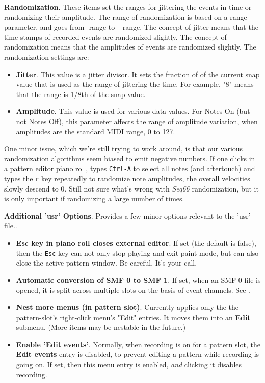    \textbf{Randomization}.
   These items set the ranges for jittering the events in time or
   randomizing their amplitude.
   The range of randomization is based on a range parameter, and
   goes from -range to +range.
   The concept of jitter means that the time-stamps of recorded events
   are randomized slightly.
   The concept of randomization means that the amplitudes of events
   are randomized slightly.
   The randomization settings are:

   \begin{itemize}
      \item \textbf{Jitter}.
         This value is a jitter divisor.
         It sets the fraction of of the current snap value that
         is used as the range of jittering the time.
         For example, "8" means that the range is 1/8th of the snap value.
      \item \textbf{Amplitude}.
         This value is used for various data values.
         For Notes On (but not Notes Off), this parameter affects
         the range of amplitude variation, when amplitudes are
         the standard MIDI range, 0 to 127.
   \end{itemize}

   One minor issue, which we're still trying to work around, is that
   our various randomization algorithms seem biased to emit
   negative numbers.
   If one clicks in a pattern editor piano roll, types
   \texttt{Ctrl-A} to select all notes (and aftertouch)
   and types the \texttt{r} key repeatedly to randomize
   note amplitudes, the overall velocities slowly descend to 0.
   Still not sure what's wrong with \textsl{Seq66} randomization, 
   but it is only important if randomizing a large number of times.

   \textbf{Additional 'usr' Options}.
   Provides a few minor options relevant to the 'usr' file..

   \begin{itemize}
      \item \textbf{Esc key in piano roll closes external editor}.
         If set (the default is false), then the \texttt{Esc}
         key can not only stop playing and exit paint mode, but
         can also close the active pattern window.
         Be careful. It's your call.
      \item \textbf{Automatic conversion of SMF 0 to SMF 1}.
         If set, when an SMF 0 file is opened, it is split
         across multiple slots on the basis of event channels.
         See .
      \item \textbf{Nest more menus (in pattern slot)}.
         Currently applies only the the pattern-slot's right-click
         menu's "Edit" entries.
         It moves them into an \textbf{Edit} submenu.
         (More items may be nestable in the future.)
      \item \textbf{Enable 'Edit events'}.
         Normally, when recording is on for a pattern slot,
         the \textbf{Edit events} entry is disabled,
         to prevent editing a pattern while recording is going on.
         If set, then this menu entry is enabled, \textsl{and}
         clicking it disables recording.
   \end{itemize}

